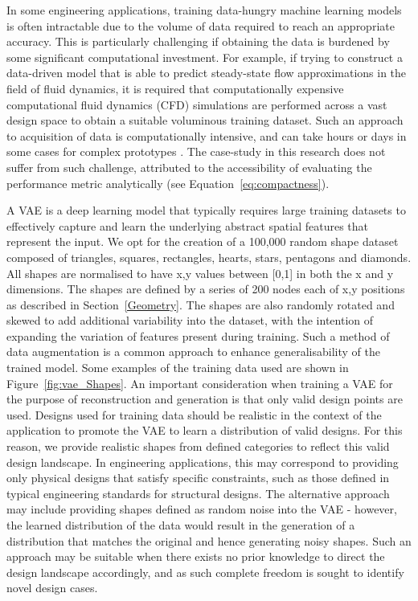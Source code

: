 \documentclass{article}
\begin{document}
In some engineering applications, training data-hungry machine learning models is often intractable due to the volume of data required to reach an appropriate accuracy. This is particularly challenging if obtaining the data is burdened by some significant computational investment. For example, if trying to construct a data-driven model that is able to predict steady-state flow approximations in the field of fluid dynamics, it is required that computationally expensive computational fluid dynamics (CFD) simulations are performed across a vast design space to obtain a suitable voluminous training dataset. Such an approach to acquisition of data is computationally intensive, and can take hours or days in some cases for complex prototypes \citep{guo2016convolutional}. The case-study in this research does not suffer from such challenge, attributed to the accessibility of evaluating the performance metric analytically (see Equation~\ref{eq:compactness}).

A VAE is a deep learning model that typically requires large training datasets to effectively capture and learn the underlying abstract spatial features that represent the input.  We opt for the creation of a 100,000 random shape dataset composed of triangles, squares, rectangles, hearts, stars, pentagons and diamonds. All shapes are normalised to have x,y values between [0,1] in both the x and y dimensions. The shapes are defined by a series of 200 nodes each of x,y positions as described in Section~\ref{Geometry}. The shapes are also randomly rotated and skewed to add additional variability into the dataset, with the intention of expanding the variation of features present during training. Such a method of data augmentation is a common approach to enhance generalisability of the trained model. Some examples of the training data used are shown in Figure~\ref{fig:vae_Shapes}. An important consideration when training a VAE for the purpose of reconstruction and generation is that only valid design points are used. Designs used for training data should be realistic in the context of the application \citep{Huang2022}  to promote the VAE to learn a distribution of valid designs. For this reason, we provide realistic shapes from defined categories to reflect this valid design landscape. In engineering applications, this may correspond to providing only physical designs that satisfy specific constraints, such as those defined in typical engineering standards for structural designs. The alternative approach may include providing shapes defined as random noise into the VAE - however, the learned distribution of the data would result in the generation of a distribution that matches the original and hence generating noisy shapes. Such an approach may be suitable when there exists no prior knowledge to direct the design landscape accordingly, and as such complete freedom is sought to identify novel design cases.
\end{document}
